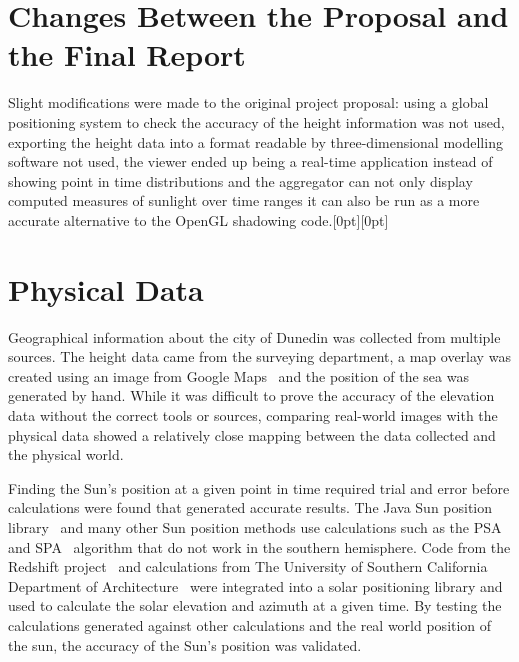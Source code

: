 \documentclass[12pt]{report}
\newcommand{\note}[1]{\raisebox{0pt}[0pt][0pt]{\pdfcomment[open=true]{#1}}}
\newcommand{\notedme}[1]{\note{#1}}
\begin{document}
\section{Changes Between the Proposal and the Final Report}
Slight modifications were made to the original project proposal: using a global positioning system to check the accuracy of the height information was not used, exporting the height data into a format readable by three-dimensional modelling software not used, the viewer ended up being a real-time application instead of showing point in time distributions and the aggregator can not only display computed measures of sunlight over time ranges it can also be run as a more accurate alternative to the OpenGL shadowing code.\notedme{Yep - good stuff! :-)}

\section{Physical Data}
Geographical information about the city of Dunedin was collected from multiple sources. The height data came from the surveying department, a map overlay was created using an image from Google Maps~\cite{gmaps} and the position of the sea was generated by hand. While it was difficult to prove the accuracy of the elevation data without the correct tools or sources, comparing real-world images with the physical data showed a relatively close mapping between the data collected and the physical world.

Finding the Sun's position at a given point in time required trial and error before calculations were found that generated accurate results. The Java Sun position library~\cite{javasunlib} and many other Sun position methods use calculations such as the PSA~\cite{psa} and SPA~\cite{spa} algorithm that do not work in the southern hemisphere\cite{southsun}. Code from the Redshift project~\cite{redshift} and calculations from The University of Southern California Department of Architecture~\cite{solarazi} were integrated into a solar positioning library and used to calculate the solar elevation and azimuth at a given time. By testing the calculations generated against other calculations and the real world position of the sun, the accuracy of the Sun's position was validated.

\end{document}
